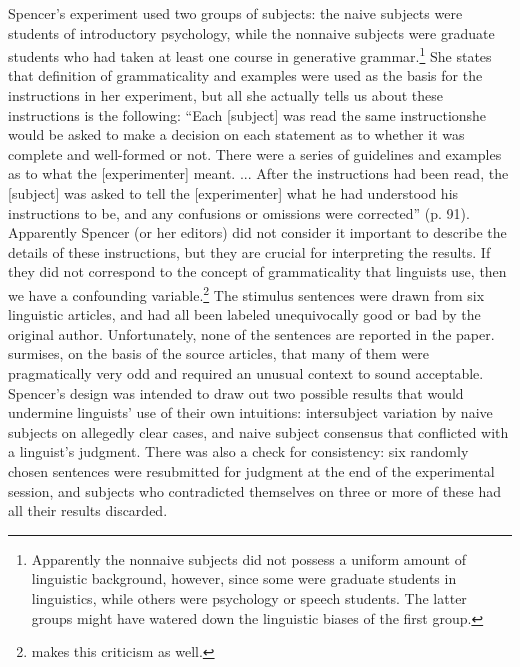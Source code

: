 \noindent
Spencer's experiment used two groups of subjects: the naive subjects were students of introductory psychology, while the nonnaive subjects were graduate students who had taken at least one course in generative grammar.\footnote{Apparently the nonnaive subjects did not possess a uniform amount of linguistic background, however, since some were graduate students in linguistics, while others were psychology or speech students. The latter groups might have watered down the linguistic biases of the first group.}
 She states that  definition of grammaticality and examples were used as the basis for the instructions in her experiment, but all she actually tells us about these instructions is the following:  ``Each [subject] was read the same instructions\schdash{}he would
be asked to make a decision on each statement as to whether it was complete and well-formed or not. There were a series of guidelines and examples as to what the [experimenter] meant. ... After the instructions had been read, the [subject] was asked to tell the [experimenter] what he had understood his instructions to be, and any confusions or omissions were corrected'' (p. 91). Apparently Spencer (or her editors) did not consider it important to describe the details of these instructions, but they are crucial for interpreting the results. If they did not correspond to the concept of grammaticality that linguists use, then we have a confounding  variable.\footnote{\citet{Newmeyer1983} makes this criticism as well.}
The stimulus sentences were drawn from six linguistic articles, and had all been labeled unequivocally good or bad by the original  author. Unfortunately, none of the sentences are reported in the paper. \citet{Newmeyer1983} surmises, on the basis of the source articles, that many of them were pragmatically very odd and required an unusual context to sound acceptable. Spencer's design was intended to draw out two possible results that would undermine linguists' use of their own intuitions: intersubject variation by naive subjects on allegedly clear cases, and naive subject consensus that conflicted with a linguist's judgment. There was also a check for consistency: six randomly chosen sentences were resubmitted for judgment at the end of the experimental session, and subjects who contradicted themselves on three or more of these had all their results discarded.

